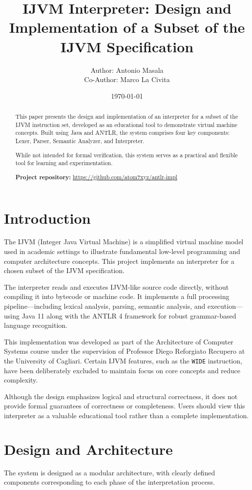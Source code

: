 \documentclass[11pt]{article}
\title{IJVM Interpreter: Design and Implementation of a Subset of the IJVM Specification}
\author{
    Author: Antonio Masala\\
    Co-Author: Marco La Civita
}
\date{\today}
\begin{document}
\maketitle

\begin{abstract}
This paper presents the design and implementation of an interpreter for a subset of the IJVM instruction set, developed as an educational tool to demonstrate virtual machine concepts. Built using Java and ANTLR, the system comprises four key components: Lexer, Parser, Semantic Analyzer, and Interpreter. 

While not intended for formal verification, this system serves as a practical and flexible tool for learning and experimentation.

\vspace{2em}
\noindent
\textbf{Project repository:} \url{https://github.com/atom7xyz/antlr-impl}
\end{abstract}

\newpage

\section{Introduction}
The IJVM (Integer Java Virtual Machine) is a simplified virtual machine model used in academic settings to illustrate fundamental low-level programming and computer architecture concepts. This project implements an interpreter for a chosen subset of the IJVM specification.

The interpreter reads and executes IJVM-like source code directly, without compiling it into bytecode or machine code. It implements a full processing pipeline—including lexical analysis, parsing, semantic analysis, and execution—using Java 11 along with the ANTLR 4 framework for robust grammar-based language recognition.

This implementation was developed as part of the Architecture of Computer Systems course under the supervision of Professor Diego Reforgiato Recupero at the University of Cagliari. Certain IJVM features, such as the \texttt{WIDE} instruction, have been deliberately excluded to maintain focus on core concepts and reduce complexity.

Although the design emphasizes logical and structural correctness, it does not provide formal guarantees of correctness or completeness. Users should view this interpreter as a valuable educational tool rather than a complete implementation.

\section{Design and Architecture}
The system is designed as a modular architecture, with clearly defined components corresponding to each phase of the interpretation process.
\end{document}
